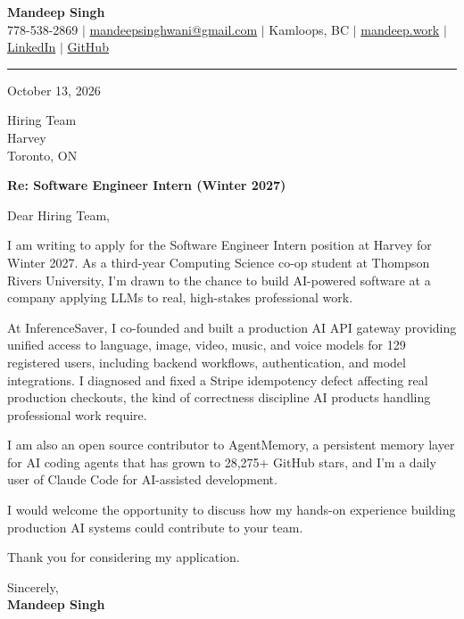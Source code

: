 \documentclass[letterpaper,11pt]{article}
\begin{document}
\begin{center}
    \textbf{\LARGE Mandeep Singh} \\ \vspace{2pt}
    \small 778-538-2869 $|$
    \href{mailto:mandeepsinghwani@gmail.com}{mandeepsinghwani@gmail.com} $|$
    Kamloops, BC $|$
    \href{https://mandeep.work}{mandeep.work} $|$
    \href{https://www.linkedin.com/in/mandeep-singh-b855972a7/}{LinkedIn} $|$
    \href{https://github.com/deepmroot}{GitHub}
\end{center}

\vspace{4pt}
\hrule
\vspace{14pt}

October 13, 2026

\vspace{8pt}
Hiring Team \\
Harvey \\
Toronto, ON

\vspace{8pt}
\textbf{Re: Software Engineer Intern (Winter 2027)}

\vspace{10pt}
Dear Hiring Team,

\vspace{4pt}
I am writing to apply for the Software Engineer Intern position at Harvey for Winter 2027. As a third-year Computing Science co-op student at Thompson Rivers University, I'm drawn to the chance to build AI-powered software at a company applying LLMs to real, high-stakes professional work.

At InferenceSaver, I co-founded and built a production AI API gateway providing unified access to language, image, video, music, and voice models for 129 registered users, including backend workflows, authentication, and model integrations. I diagnosed and fixed a Stripe idempotency defect affecting real production checkouts, the kind of correctness discipline AI products handling professional work require.

I am also an open source contributor to AgentMemory, a persistent memory layer for AI coding agents that has grown to 28,275+ GitHub stars, and I'm a daily user of Claude Code for AI-assisted development.

I would welcome the opportunity to discuss how my hands-on experience building production AI systems could contribute to your team.

Thank you for considering my application.

\vspace{16pt}
Sincerely, \\
\vspace{6pt}
\textbf{Mandeep Singh}
\end{document}
